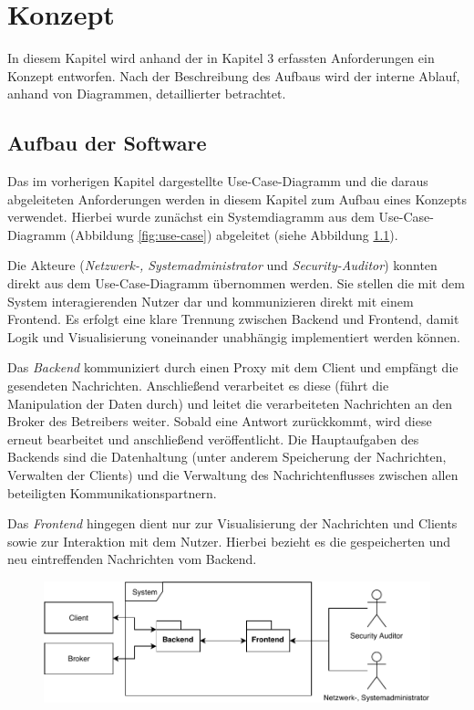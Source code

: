 \chapter{Konzept}
In diesem Kapitel wird anhand der in Kapitel 3 erfassten Anforderungen ein Konzept entworfen. Nach der Beschreibung des Aufbaus wird der interne Ablauf, anhand von Diagrammen, detaillierter betrachtet.

\section{Aufbau der Software}
    Das im vorherigen Kapitel dargestellte Use-Case-Diagramm und die daraus abgeleiteten Anforderungen werden in diesem Kapitel zum Aufbau eines Konzepts verwendet.
    Hierbei wurde zunächst ein Systemdiagramm aus dem Use-Case-Diagramm (Abbildung \ref{fig:use-case}) abgeleitet (siehe Abbildung \ref{fig:system_all}).
    
    Die Akteure (\emph{Netzwerk-, Systemadministrator} und \emph{Security-Auditor}) konnten direkt aus dem Use-Case-Diagramm übernommen werden.
    Sie stellen die mit dem System interagierenden Nutzer dar und kommunizieren direkt mit einem Frontend.
    Es erfolgt eine klare Trennung zwischen Backend und Frontend, damit Logik und Visualisierung voneinander unabhängig implementiert werden können.
    
    Das \emph{Backend} kommuniziert durch einen Proxy mit dem Client und empfängt die gesendeten Nachrichten. Anschließend verarbeitet es diese (führt die Manipulation der Daten durch) und leitet die verarbeiteten Nachrichten an den Broker des Betreibers weiter. Sobald eine Antwort zurückkommt, wird diese erneut bearbeitet und anschließend veröffentlicht.
    Die Hauptaufgaben des Backends sind die Datenhaltung (unter anderem Speicherung der Nachrichten, Verwalten der Clients) und die Verwaltung des Nachrichtenflusses zwischen allen beteiligten Kommunikationspartnern.
    
    Das \emph{Frontend} hingegen dient nur zur Visualisierung der Nachrichten und Clients sowie zur Interaktion mit dem Nutzer. Hierbei bezieht es die gespeicherten und neu eintreffenden Nachrichten vom Backend.
    \begin{figure}[h]%
        \centering
        \includegraphics[width=14cm]{tex/bilder/4_konzept/Systemdiagram.pdf}
        \label{fig:system_all}
    \end{figure}
    

